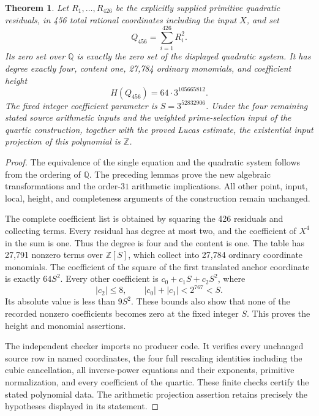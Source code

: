 \documentclass[11pt,a4paper]{article}
\newtheorem{theorem}{Theorem}[section]
\theoremstyle{definition}
\theoremstyle{remark}
\begin{document}
\begin{theorem}\label{q456:polynomial}
Let $R_1,\ldots,R_{426}$ be the explicitly supplied primitive quadratic
residuals, in 456 total rational coordinates including the input $X$,
and set
\[
                           Q_{456}=\sum_{i=1}^{426}R_i^2.
\]
Its zero set over $\mathbb Q$ is exactly the zero set of the displayed
quadratic system. It has degree exactly four, content one, 27,784
ordinary monomials, and coefficient height
\[
                          H(Q_{456})=64\cdot3^{105665812}.
\]
The fixed integer coefficient parameter is $S=3^{52832906}$.
Under the four remaining stated source arithmetic inputs and the
weighted prime-selection input of the quartic construction, together
with the proved Lucas estimate, the existential input projection of
this polynomial is $\mathbb Z$.
\end{theorem}
\begin{proof}
The equivalence of the single equation and the quadratic system follows
from the ordering of $\mathbb Q$. The preceding lemmas prove the new
algebraic transformations and the order-$31$ arithmetic implications.
All other point, input, local, height, and completeness arguments of
the construction remain unchanged.

The complete coefficient list is obtained by squaring the 426 residuals
and collecting terms. Every residual has degree at most two, and the
coefficient of $X^4$ in the sum is one. Thus the degree is four and
the content is one. The table has 27,791 nonzero terms over
$\mathbb Z[S]$, which collect into 27,784 ordinary coordinate monomials.
The coefficient of the square of the first translated anchor coordinate
is exactly $64S^2$. Every other coefficient is
$c_0+c_1S+c_2S^2$, where
\[
                      |c_2|\le8,
                 \qquad |c_0|+|c_1|<2^{767}<S.
\]
Its absolute value is less than $9S^2$. These bounds also show that
none of the recorded nonzero coefficients becomes zero at the fixed
integer $S$. This proves the height and monomial assertions.

The independent checker imports no producer code. It verifies every
unchanged source row in named coordinates, the four full rescaling
identities including the cubic cancellation, all inverse-power
equations and their exponents, primitive normalization, and every
coefficient of the quartic. These finite checks certify the stated
polynomial data. The arithmetic projection assertion retains precisely
the hypotheses displayed in its statement.
\end{proof}
\end{document}
